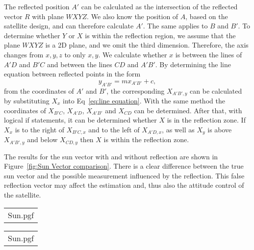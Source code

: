 The reflected position $A'$ can be calculated as the intersection of the reflected vector $R$ with plane $WXYZ$. We also know the position of $A$, based on the satellite design, and can therefore calculate $A'$. The same applies to $B$ and $B'$. To determine whether $Y$ or $X$ is within the reflection region, we assume that the plane $WXYZ$ is a 2D plane, and we omit the third dimension. Therefore, the axis changes from $x, y, z$ to only $x, y$. We calculate whether $x$ is between the lines of $A'D$ and $B'C$ and between the lines $CD$ and $A'B'$. By determining the line equation between reflected points in the form 
\begin{equation}
y_{A'B'} = mx_{A'B'} + c,
\label{eq:line equation}
\end{equation}
from the coordinates of $A'$ and $B'$, the corresponding $X_{A'B',y}$ can be calculated by substituting $X_x$ into Eq~\ref{eq:line equation}. With the same method the coordinates of $X_{B'C}$, $X_{A'D}$, $X_{A'B'}$ and $X_{CD}$ can be determined. After that, with logical if statements, it can be determined whether $X$ is in the reflection zone. If $X_x$ is to the right of $X_{B'C,x}$ and to the left of $X_{A'D,x}$, as well as $X_y$ is above $X_{A'B',y}$ and below $X_{CD,y}$ then $X$ is within the reflection zone. 

The results for the sun vector with and without reflection are shown in Figure~\ref{fig:Sun Vector comparison}. There is a clear difference between the true sun vector and the possible measurement influenced by the reflection.  This false reflection vector may affect the estimation and, thus also the attitude control of the satellite.

\begin{figure*}[!htb]
	\begin{tabular}{@{}c@{}}
		\centering
		{Sun.pgf}
		\label{fig:Sun Vector comparison with reflection}
	\end{tabular}
	\begin{tabular}{@{}c@{}}
		\centering
		{Sun.pgf}
		\label{fig:Sun Vector comparison without reflection}
	\end{tabular}
	
	\caption{Comparison of Sun Vector with and without Reflection}
	\label{fig:Sun Vector comparison}
	
\end{figure*}

